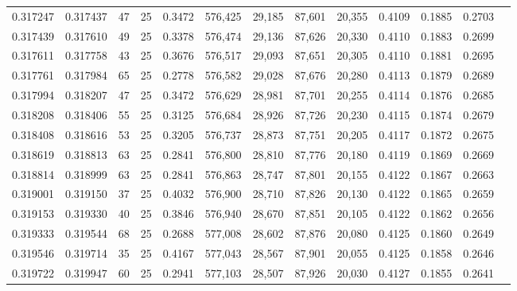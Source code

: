 \begin{tabular}{rrrrrrrrrrrrr}
0.317247 & 0.317437 &    47 &  25 &                                     0.3472 & 576,425 &  29,185 &  87,601 &  20,355 & 0.4109 & 0.1885 & 0.2703 \\
0.317439 & 0.317610 &    49 &  25 &                                     0.3378 & 576,474 &  29,136 &  87,626 &  20,330 & 0.4110 & 0.1883 & 0.2699 \\
0.317611 & 0.317758 &    43 &  25 &                                     0.3676 & 576,517 &  29,093 &  87,651 &  20,305 & 0.4110 & 0.1881 & 0.2695 \\
0.317761 & 0.317984 &    65 &  25 &                                     0.2778 & 576,582 &  29,028 &  87,676 &  20,280 & 0.4113 & 0.1879 & 0.2689 \\
0.317994 & 0.318207 &    47 &  25 &                                     0.3472 & 576,629 &  28,981 &  87,701 &  20,255 & 0.4114 & 0.1876 & 0.2685 \\
0.318208 & 0.318406 &    55 &  25 &                                     0.3125 & 576,684 &  28,926 &  87,726 &  20,230 & 0.4115 & 0.1874 & 0.2679 \\
0.318408 & 0.318616 &    53 &  25 &                                     0.3205 & 576,737 &  28,873 &  87,751 &  20,205 & 0.4117 & 0.1872 & 0.2675 \\
0.318619 & 0.318813 &    63 &  25 &                                     0.2841 & 576,800 &  28,810 &  87,776 &  20,180 & 0.4119 & 0.1869 & 0.2669 \\
0.318814 & 0.318999 &    63 &  25 &                                     0.2841 & 576,863 &  28,747 &  87,801 &  20,155 & 0.4122 & 0.1867 & 0.2663 \\
0.319001 & 0.319150 &    37 &  25 &                                     0.4032 & 576,900 &  28,710 &  87,826 &  20,130 & 0.4122 & 0.1865 & 0.2659 \\
0.319153 & 0.319330 &    40 &  25 &                                     0.3846 & 576,940 &  28,670 &  87,851 &  20,105 & 0.4122 & 0.1862 & 0.2656 \\
0.319333 & 0.319544 &    68 &  25 &                                     0.2688 & 577,008 &  28,602 &  87,876 &  20,080 & 0.4125 & 0.1860 & 0.2649 \\
0.319546 & 0.319714 &    35 &  25 &                                     0.4167 & 577,043 &  28,567 &  87,901 &  20,055 & 0.4125 & 0.1858 & 0.2646 \\
0.319722 & 0.319947 &    60 &  25 &                                     0.2941 & 577,103 &  28,507 &  87,926 &  20,030 & 0.4127 & 0.1855 & 0.2641 \\

\end{tabular}
